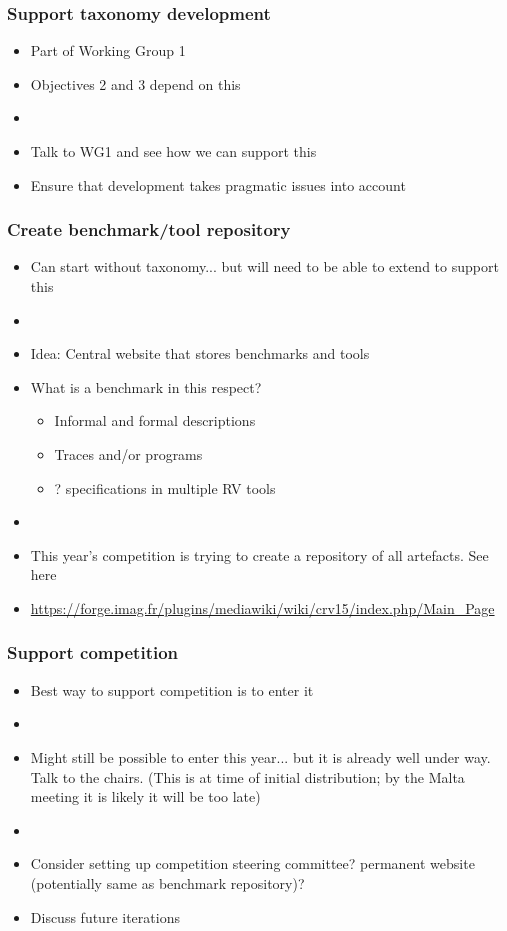 \documentclass{beamer}
\begin{document}
\begin{frame}
\frametitle{Support taxonomy development}
\begin{itemize}
	\item Part of Working Group 1
	\item Objectives 2 and 3 depend on this
	\item[]
	\item Talk to WG1 and see how we can support this
	\item Ensure that development takes pragmatic issues into account
\end{itemize}
\end{frame}

\begin{frame}
\frametitle{Create benchmark/tool repository}
\begin{itemize}
	\item Can start without taxonomy... but will need to be able to extend to support this
	\item[]
	\item Idea: Central website that stores benchmarks and tools
	\item What is a benchmark in this respect?
	\begin{itemize}
		\item Informal and formal descriptions
		\item Traces and/or programs
		\item ? specifications in multiple RV tools
	\end{itemize}
	\item[]
	\item This year's competition is trying to create a repository of all artefacts. See here
	\item[] \url{https://forge.imag.fr/plugins/mediawiki/wiki/crv15/index.php/Main_Page}
\end{itemize}
\end{frame}

\begin{frame}
\frametitle{Support competition}
\begin{itemize}
	\item Best way to support competition is to enter it
	\item[]
	\item Might still be possible to enter this year... but it is already well under way. Talk to the chairs. (This is at time of initial distribution; by the Malta meeting it is likely it will be too late)
	\item[]
	\item Consider setting up competition steering committee? permanent website (potentially same as benchmark repository)?
	\item Discuss future iterations
\end{itemize}
\end{frame}
\end{document}
